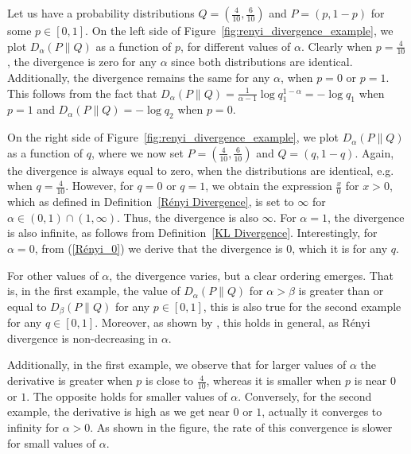 \begin{example}
	Let us have a probability distributions $Q = (\frac{4}{10},\frac{6}{10})$ and $P = (p,1-p)$ for some $p \in [0,1]$. On the left side of Figure~\ref{fig:renyi_divergence_example}, we plot $D_\alpha(P\|Q)$ as a function of $p$, for different values of $\alpha$. Clearly when $p=\frac{4}{10}$, the divergence is zero for any $\alpha$ since both distributions are identical. Additionally, the divergence remains the same for any $\alpha$, when $p=0$ or $p=1$. This follows from the fact that $D_\alpha(P\|Q) = \frac{1}{\alpha-1} \log q_1^{1-\alpha} = - \log q_1$ when $p=1$ and $D_\alpha(P\|Q) = - \log q_2$ when $p=0$.
	
	On the right side of Figure~\ref{fig:renyi_divergence_example}, we plot  $D_\alpha(P\|Q)$ as a function of $q$, where we now set $P = (\frac{4}{10},\frac{6}{10})$ and $Q = (q,1-q)$. Again, the divergence is always equal to zero, when the distributions are identical, e.g. when $q=\frac{4}{10}$. However, for $q=0$ or $q=1$, we obtain the expression $\frac{x}{0}$ for $x>0$, which as defined in Definition~\ref{Rényi Divergence}, is set to $\infty$ for $\alpha \in (0,1) \cap (1,\infty)$. Thus, the divergence is also $\infty$. For $\alpha = 1$, the divergence is also infinite, as follows from Definition~\ref{KL Divergence}.	Interestingly, for $\alpha=0$, from (\ref{Rényi_0}) we derive that the divergence is 0, which it is for any $q$. 
	
	For other values of $\alpha$, the divergence varies, but a clear ordering emerges. That is, in the first example, the value of $D_\alpha(P\|Q)$ for $\alpha > \beta$ is greater than or equal to $D_\beta(P\|Q)$ for any $p \in [0,1]$, this is also true for the second example for any $q \in [0,1]$. Moreover, as shown by \cite{vanErvenHarremoës2012}, this holds in general, as Rényi divergence is non-decreasing in $\alpha$.
	
	Additionally, in the first example, we observe that for larger values of $\alpha$ the derivative is greater when $p$ is close to $\frac{4}{10}$, whereas it is smaller when $p$ is near $0$ or $1$. The opposite holds for smaller values of $\alpha$. Conversely, for the second example, the derivative is high as we get near $0$ or $1$, actually it converges to infinity for $\alpha>0$. As shown in the figure, the rate of this convergence is slower for small values of $\alpha$.
	 

\end{example}
